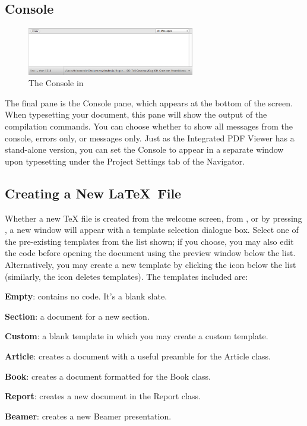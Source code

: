 \pagebreak\clearpage
\subsection{Console}
\label{userguide.quickstart.console}
\begin{figure}[htbp]
\centering
\includegraphics[width=0.65\textwidth]{TeXnicle-Images/texnicle-console.png}
\caption{The Console in \texnicle}
\label{fig:texnicle-console}
\end{figure}
The final pane is the Console pane, which appears at the bottom of the screen. When typesetting your document, this pane will show the output of the compilation commands. You can choose whether to show all messages from the console, errors only, or \texnicle messages only. Just as the Integrated PDF Viewer has a stand-alone version, you can set the Console to appear in a separate window upon typesetting under the Project Settings tab of the Navigator.

\subsection[Creating a New File]{Creating a New \LaTeX\ File}
\label{userguide.newdoc}
Whether a new {\TeX} file is created from the welcome screen, from , or by pressing , a new window will appear with a template selection dialogue box. Select one of the pre-existing templates from the list shown; if you choose, you may also edit the code before opening the document using the preview window below the list. Alternatively, you may create a new template by clicking the \menu{$+$} icon below the list (similarly, the \menu{$-$} icon deletes templates). The templates included are:
	\begin{itemize*}
		\item \textbf{Empty}: contains no code. It's a blank slate.
		\item \textbf{Section}: a document for a new section.
		\item \textbf{Custom}: a blank template in which you may create a custom template.
		\item \textbf{Article}: creates a document with a useful preamble for the Article class.
		\item \textbf{Book}: creates a document formatted for the Book class.
		\item \textbf{Report}: creates a new document in the Report class.
		\item \textbf{Beamer}: creates a new Beamer presentation.
	\end{itemize*}

